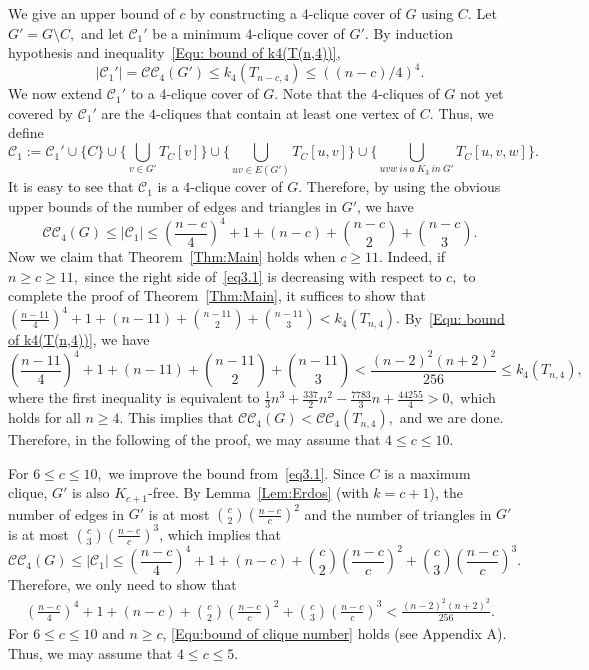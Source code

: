 \documentclass[11pt,a4paper]{article}
\newcommand{\dC}{{\mathcal{C}}}
\newcommand{\turangraph}[2]{T_{#1,#2}}
\begin{document}
We give an upper bound of $c$ by constructing a $4$-clique cover of $G$ using $C$.  
Let $G'= G\setminus C,$
and let $\mathcal{C}_1'$ be a minimum $4$-clique cover of $G'.$
By induction hypothesis and inequality~\eqref{Equ: bound of k4(T(n,4))}, 
$$|\mathcal{C}_1'|=\mathcal{C}\mathcal{C}_4(G')\le k_4(\turangraph{n-c}{4})\le ((n-c)/4)^4.$$
We now extend $\mathcal{C}_1'$ to a $4$-clique cover of $G.$
Note that the $4$-cliques of $G$ not yet covered by $\mathcal{C}_1'$ are the $4$-cliques that contain at least one vertex of $C.$
Thus, we define
\begin{equation*}
\mathcal{C}_1:=
\mathcal{C}_1'\cup
\{C\} \cup
\{\bigcup_{v\in G'}T_C[v]\}
\cup \{\bigcup_{uv \in E(G')}T_C[u,v]\}
\cup \{\bigcup_{uvw \  is \ a \  K_3 \ in \  G'}T_C[u,v,w]\}. 
\end{equation*}
It is easy to see that $\dC_1$ is a $4$-clique cover of $G.$ 
Therefore, by using the obvious upper bounds of the number of edges and triangles in $G'$, we have
\begin{equation}\label{eq3.1}
\mathcal{C}\mathcal{C}_4(G)
\leq 
|\dC_1|\leq
\left(\frac{n-c}{4}\right)^4+1+(n-c)+ \binom{n-c}{2} + \binom{n-c}{3}.
\end{equation} 
Now we claim that Theorem~\ref{Thm:Main} holds when $c \ge 11.$
Indeed,  if $n\ge c\ge 11,$ since the right side of~\eqref{eq3.1} is decreasing with respect to $c,$
to complete the proof of Theorem~\ref{Thm:Main}, it suffices to show that
$\left(\frac{n-11}{4}\right)^4+1+(n-11)+ \binom{n-11}{2} + \binom{n-11}{3} < k_4(\turangraph{n}{4}).$
By~\eqref{Equ: bound of k4(T(n,4))}, we have
$$\left(\frac{n-11}{4}\right)^4+1+(n-11)+ \binom{n-11}{2} + \binom{n-11}{3}<
\frac{(n-2)^2(n+2)^2}{256}\le k_4(\turangraph{n}{4}),$$
where the first inequality is equivalent to 
$\frac{1}{3}n^3+\frac{337}{2}n^2-\frac{7783}{3}n+\frac{44255}{4}>0,$
which holds for all $n\ge 4.$
This implies that 
$\mathcal{C}\mathcal{C}_4(G)< \mathcal{C}\mathcal{C}_4(\turangraph{n}{4}),$
and we are done.
Therefore, in the following of the proof, we may assume that $4\le c\le 10.$

For $6\leq c \leq 10,$ we improve the bound from~\eqref{eq3.1}.
Since $C$ is a maximum clique, $G'$ is also $K_{c+1}$-free.
By Lemma~\ref{Lem:Erdos} (with $k=c+1$), the number of edges in $G'$ is at most 
$\binom{c}{2} \left(\frac{n-c}{c}\right)^2$ 
and the number of triangles in $G'$ is at most 
$\binom{c}{3} \left(\frac{n-c}{c}\right)^3$, which implies that
\begin{equation*}
\mathcal{C}\mathcal{C}_4(G)
\leq 
|\dC_1|\leq
\left(\frac{n-c}{4}\right)^4 +1 +(n-c)+\binom c2\left(\frac{n-c}{c}\right)^2+\binom{c}{3}\left(\frac{n-c}{c}\right)^3.
\end{equation*}
Therefore, we only need to show that
\begin{align}\label{Equ:bound of clique number}
    \left(\frac{n-c}{4}\right)^4 +1 +(n-c)+\binom c2\left(\frac{n-c}{c}\right)^2 +\binom{c}{3}\left(\frac{n-c}{c}\right)^3
< \frac{(n-2)^2(n+2)^2}{256}.
\end{align}
For $6\le c \le 10$ and $n \geq c$, \eqref{Equ:bound of clique number} holds (see Appendix A). 
Thus, we may assume that $4\le c\le 5.$
\end{document}

